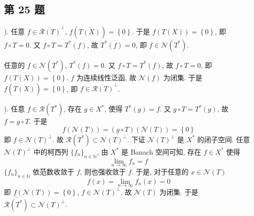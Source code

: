 \documentclass[../main.tex]{subfiles}
\begin{document}
\subsection{第 25 题}
).
任意 $f \in \overline{\mathscr{R} \left( T \right)}^\bot$, $f \left( \overline{T \left( X \right)} \right) = \left\{ 0 \right\}$.
于是 $f \left( T \left( X \right) \right) = \left\{ 0 \right\}$, 即 $f \circ T = 0$.
又 $f \circ T = T^* \left( f \right)$, 故 $T^* \left( f \right) = 0$, 即 $f \in \mathscr{N} \left( T^* \right)$.

任意的 $f \in \mathscr{N} \left( T^* \right)$, $T^* \left( f \right) = 0$.
又 $f \circ T = T^* \left( f \right)$, 故 $f \circ T = 0$, 即 $f \left( T \left( X \right) \right) = \left\{ 0 \right\}$.
$f$ 为连续线性泛函, 故 $\mathscr{N} \left( f \right)$ 为闭集.
于是 $f \left( \overline{T \left( X \right)} \right) = \left\{ 0 \right\}$, 即 $f \in \overline{\mathscr{R} \left( T \right)}^\bot$.

).
任意 $f \in \mathscr{R} \left( T^* \right)$, 存在 $g \in X^*$, 使得 $T^* \left( g \right) = f$.
又 $g \circ T = T^* \left( g \right)$, 故 $f = g \circ T$.
于是
\[
    f \left( \mathscr{N} \left( T \right) \right)
    = \left( g \circ T \right) \left( \mathscr{N} \left( T \right) \right)
    = \left\{ 0 \right\}
\]
即 $f \in \mathscr{N} \left( T \right)^\bot$.
故 $\mathscr{R} \left( T^* \right) \subset \mathscr{N} \left( T \right)^\bot$.
下证 $\mathscr{N} \left( T \right)^\bot$ 是 $X^*$ 的闭子空间.
任意 $\mathscr{N} \left( T \right)^\bot$ 中的柯西列 $\{ f_{n} \}_{n \in \mathbb{N}}$, 由 $X^*$ 是 Banach 空间可知, 存在 $f \in X^*$ 使得
\[
    \lim_{n \to \infty} f_n = f
\]
$\{ f_{n} \}_{n \in \mathbb{N}}$ 依范数收敛于 $f$, 则也强收敛于 $f$.
于是, 对于任意的 $x \in \mathscr{N} \left( T \right)$
\[
    f \left( x \right) = \lim_{n \to \infty} f_n \left( x \right) = 0
\]
即 $f \left( \mathscr{N} \left( T \right) \right) = \left\{ 0 \right\}$, $f \in \mathscr{N} \left( T \right)^\bot$.
故 $\mathscr{N} \left( T \right)$ 为闭集.
于是 $\overline{\mathscr{R} \left( T^* \right)} \subset \mathscr{N} \left( T \right)^\bot$.
\end{document}

